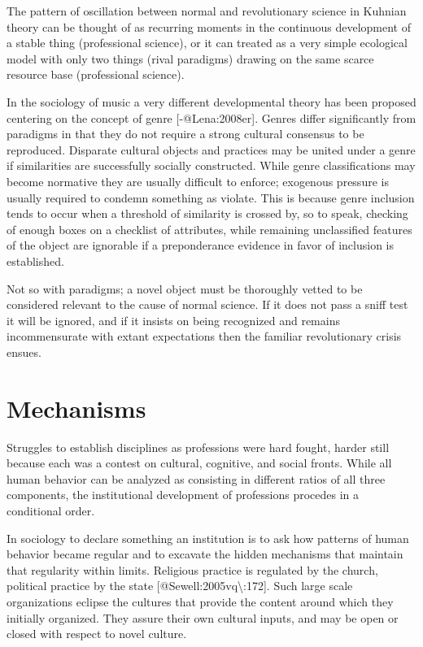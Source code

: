 \documentclass[]{article}
\begin{document}
The pattern of oscillation between normal and revolutionary science in
Kuhnian theory can be thought of as recurring moments in the continuous
development of a stable thing (professional science), or it can treated
as a very simple ecological model with only two things (rival paradigms)
drawing on the same scarce resource base (professional science).

In the sociology of music a very different developmental theory has been
proposed centering on the concept of genre {[}-@Lena:2008er{]}. Genres
differ significantly from paradigms in that they do not require a strong
cultural consensus to be reproduced. Disparate cultural objects and
practices may be united under a genre if similarities are successfully
socially constructed. While genre classifications may become normative
they are usually difficult to enforce; exogenous pressure is usually
required to condemn something as violate. This is because genre
inclusion tends to occur when a threshold of similarity is crossed by,
so to speak, checking of enough boxes on a checklist of attributes,
while remaining unclassified features of the object are ignorable if a
preponderance evidence in favor of inclusion is established.

Not so with paradigms; a novel object must be thoroughly vetted to be
considered relevant to the cause of normal science. If it does not pass
a sniff test it will be ignored, and if it insists on being recognized
and remains incommensurate with extant expectations then the familiar
revolutionary crisis ensues.

\section{Mechanisms}\label{mechanisms}

Struggles to establish disciplines as professions were hard fought,
harder still because each was a contest on cultural, cognitive, and
social fronts. While all human behavior can be analyzed as consisting in
different ratios of all three components, the institutional development
of professions procedes in a conditional order.

In sociology to declare something an institution is to ask how patterns
of human behavior became regular and to excavate the hidden mechanisms
that maintain that regularity within limits. Religious practice is
regulated by the church, political practice by the state
{[}@Sewell:2005vq\textbackslash{}:172{]}. Such large scale organizations
eclipse the cultures that provide the content around which they
initially organized. They assure their own cultural inputs, and may be
open or closed with respect to novel culture.
\end{document}

